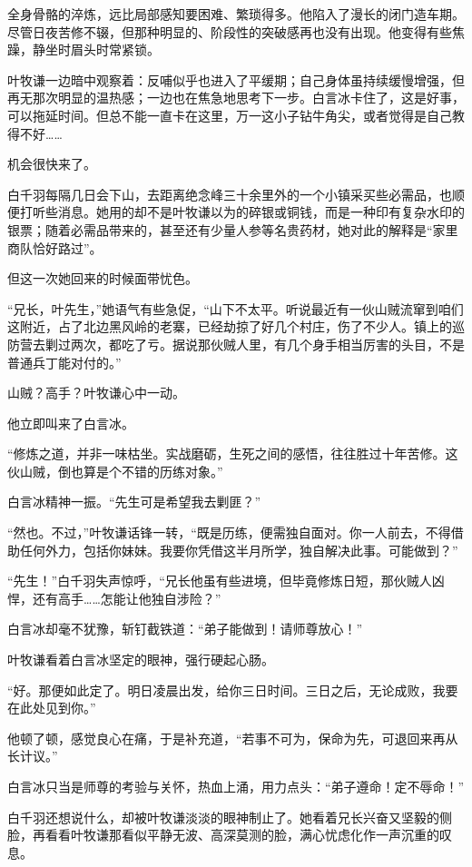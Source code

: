 全身骨骼的淬炼，远比局部感知要困难、繁琐得多。他陷入了漫长的闭门造车期。尽管日夜苦修不辍，但那种明显的、阶段性的突破感再也没有出现。他变得有些焦躁，静坐时眉头时常紧锁。

叶牧谦一边暗中观察着：反哺似乎也进入了平缓期；自己身体虽持续缓慢增强，但再无那次明显的温热感；一边也在焦急地思考下一步。白言冰卡住了，这是好事，可以拖延时间。但总不能一直卡在这里，万一这小子钻牛角尖，或者觉得是自己教得不好……

机会很快来了。

白千羽每隔几日会下山，去距离绝念峰三十余里外的一个小镇采买些必需品，也顺便打听些消息。她用的却不是叶牧谦以为的碎银或铜钱，而是一种印有复杂水印的银票；随着必需品带来的，甚至还有少量人参等名贵药材，她对此的解释是“家里商队恰好路过”。

但这一次她回来的时候面带忧色。

“兄长，叶先生，”她语气有些急促，“山下不太平。听说最近有一伙山贼流窜到咱们这附近，占了北边黑风岭的老寨，已经劫掠了好几个村庄，伤了不少人。镇上的巡防营去剿过两次，都吃了亏。据说那伙贼人里，有几个身手相当厉害的头目，不是普通兵丁能对付的。”

山贼？高手？叶牧谦心中一动。

他立即叫来了白言冰。

“修炼之道，并非一味枯坐。实战磨砺，生死之间的感悟，往往胜过十年苦修。这伙山贼，倒也算是个不错的历练对象。”

白言冰精神一振。“先生可是希望我去剿匪？”

“然也。不过，”叶牧谦话锋一转，“既是历练，便需独自面对。你一人前去，不得借助任何外力，包括你妹妹。我要你凭借这半月所学，独自解决此事。可能做到？”

“先生！”白千羽失声惊呼，“兄长他虽有些进境，但毕竟修炼日短，那伙贼人凶悍，还有高手……怎能让他独自涉险？”

白言冰却毫不犹豫，斩钉截铁道：“弟子能做到！请师尊放心！”

叶牧谦看着白言冰坚定的眼神，强行硬起心肠。

“好。那便如此定了。明日凌晨出发，给你三日时间。三日之后，无论成败，我要在此处见到你。”

他顿了顿，感觉良心在痛，于是补充道，“若事不可为，保命为先，可退回来再从长计议。”

白言冰只当是师尊的考验与关怀，热血上涌，用力点头：“弟子遵命！定不辱命！”

白千羽还想说什么，却被叶牧谦淡淡的眼神制止了。她看着兄长兴奋又坚毅的侧脸，再看看叶牧谦那看似平静无波、高深莫测的脸，满心忧虑化作一声沉重的叹息。

\vspace{2em}


